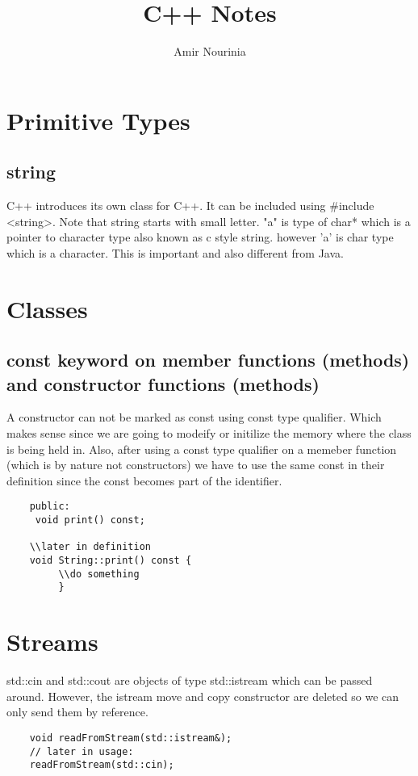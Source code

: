\documentclass[11pt,twoside,a4paper]{report}
\author{Amir Nourinia}
\title{C++ Notes}
\begin{document}
    \maketitle
    \tableofcontents
\chapter{Primitive Types}

\section{string}
C++ introduces its own class for C++. It can be included using \#include <string>.
Note that string starts with small letter.
"a" is type of char* which is a pointer to character type also known as c style string.
however 'a' is char type which is a character. This is important and also different from Java.




\chapter{Classes}
\section{const keyword on member functions (methods) and constructor functions (methods)}
A constructor can not be marked as const using const type qualifier. Which makes sense since we are going to modeify or initilize the memory where the class is being held in.
Also, after using a const type qualifier on a memeber function (which is by nature not constructors) we have to use the same const in their definition since the const becomes part of the
identifier.

\begin{lstlisting}
    public:
     void print() const;

    \\later in definition
    void String::print() const {
         \\do something
         }
\end{lstlisting}

\chapter{Streams}
std::cin and std::cout are objects of type std::istream which can be passed around. However, the istream move and copy constructor are deleted so we can only send them by reference.

\begin{lstlisting}
    void readFromStream(std::istream&);
    // later in usage:
    readFromStream(std::cin);
\end{lstlisting}
\end{document}
